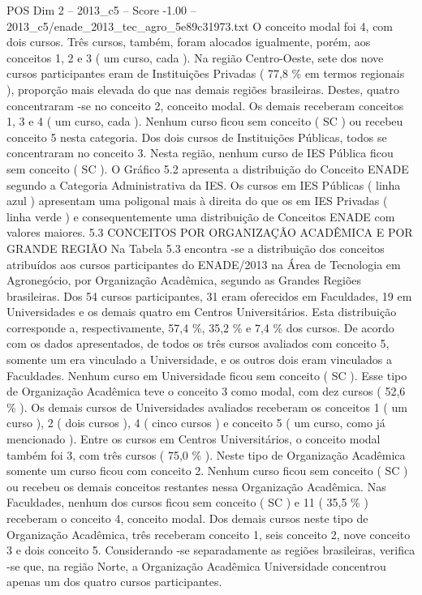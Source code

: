 \begin{textsample}{POS Dim 2 – 2013\_c5 – Score -1.00 – 2013\_c5/enade\_2013\_tec\_agro\_5e89c31973.txt}
O conceito modal foi 4, com dois cursos.
Três cursos, também, foram alocados igualmente, porém, aos conceitos 1, 2 e 3 ( um curso, cada ).
Na região Centro-Oeste, sete dos nove cursos participantes eram de Instituições Privadas ( 77,8 \% em termos regionais ), proporção mais elevada do que nas demais regiões brasileiras.
Destes, quatro concentraram -se no conceito 2, conceito modal.
Os demais receberam conceitos 1, 3 e 4 ( um curso, cada ).
Nenhum curso ficou sem conceito ( SC ) ou recebeu conceito 5 nesta categoria.
Dos dois cursos de Instituições Públicas, todos se concentraram no conceito 3.
Nesta região, nenhum curso de IES Pública ficou sem conceito ( SC ).
O Gráfico 5.2 apresenta a distribuição do Conceito ENADE segundo a Categoria Administrativa da IES.
Os cursos em IES Públicas ( linha azul ) apresentam uma poligonal mais à direita do que os em IES Privadas ( linha verde ) e consequentemente uma distribuição de Conceitos ENADE com valores maiores. 5.3 CONCEITOS POR ORGANIZAÇÃO ACADÊMICA E POR GRANDE REGIÃO Na Tabela 5.3 encontra -se a distribuição dos conceitos atribuídos aos cursos participantes do ENADE/2013 na Área de Tecnologia em Agronegócio, por Organização Acadêmica, segundo as Grandes Regiões brasileiras.
Dos 54 cursos participantes, 31 eram oferecidos em Faculdades, 19 em Universidades e os demais quatro em Centros Universitários.
Esta distribuição corresponde a, respectivamente, 57,4 \%, 35,2 \% e 7,4 \% dos cursos.
De acordo com os dados apresentados, de todos os três cursos avaliados com conceito 5, somente um era vinculado a Universidade, e os outros dois eram vinculados a Faculdades.
Nenhum curso em Universidade ficou sem conceito ( SC ).
Esse tipo de Organização Acadêmica teve o conceito 3 como modal, com dez cursos ( 52,6 \% ).
Os demais cursos de Universidades avaliados receberam os conceitos 1 ( um curso ), 2 ( dois cursos ), 4 ( cinco cursos ) e conceito 5 ( um curso, como já mencionado ).
Entre os cursos em Centros Universitários, o conceito modal também foi 3, com três cursos ( 75,0 \% ).
Neste tipo de Organização Acadêmica somente um curso ficou com conceito 2.
Nenhum curso ficou sem conceito ( SC ) ou recebeu os demais conceitos restantes nessa Organização Acadêmica.
Nas Faculdades, nenhum dos cursos ficou sem conceito ( SC ) e 11 ( 35,5 \% ) receberam o conceito 4, conceito modal.
Dos demais cursos neste tipo de Organização Acadêmica, três receberam conceito 1, seis conceito 2, nove conceito 3 e dois conceito 5.
Considerando -se separadamente as regiões brasileiras, verifica -se que, na região Norte, a Organização Acadêmica Universidade concentrou apenas um dos quatro cursos participantes.

\end{textsample}

